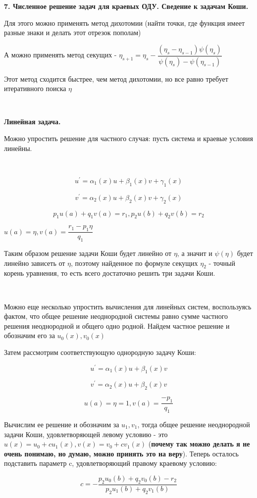 \documentclass{article}
\newenvironment{para}[1]
{\begin{Large}
\textbf{#1}
\end{Large}
\vspace{0.5cm}}
{\vspace{1cm}}
\begin{document}
\begin{para}{7. Численное решение задач для краевых ОДУ. Сведение к задачам Коши.}
Для этого можно применять метод дихотомии (найти точки, где функция имеет разные знаки и делать этот отрезок пополам)

А можно применять метод секущих - $\eta_{s + 1} = \eta_s - \dfrac{(\eta_s - \eta_{s - 1}) \psi(\eta_s)}{\psi(\eta_s) - \psi(\eta_{s - 1})}$

Этот метод сходится быстрее, чем метод дихотомии, но все равно требует итеративного поиска $\eta$

~\

\textbf{Линейная задача.}

Можно упростить решение для частного случая: пусть система и краевые условия линейны.

~\

$$u^\prime = \alpha_1 (x) u + \beta_1(x) v + \gamma_1(x)$$

$$v^\prime = \alpha_2 (x) u + \beta_2(x) v + \gamma_2(x)$$

$$ p_1u(a) + q_1v(a) = r_1, p_2u(b) + q_2v(b) = r_2 $$

$u(a) = \eta, v(a) = \dfrac{r_1 - p_1 \eta}{q_1}$


Таким образом решение задачи Коши будет линейно от $\eta$, а значит и $\psi(\eta)$ будет линейно зависеть от $\eta$, поэтому найденное по формуле секущих $\eta_2$ - точный корень уравнения, то есть всего достаточно решить три задачи Коши.

~\

Можно еще несколько упростить вычисления для линейных систем, воспользуясь фактом, что общее решение неоднородной системы равно сумме частного решения неоднородной и общего одно								родной. Найдем частное решение и обозначим его за $u_0(x), v_0(x)$

Затем рассмотрим соответствующую однородную задачу Коши:

$$u^\prime = \alpha_1 (x) u + \beta_1(x) v$$

$$v^\prime = \alpha_2 (x) u + \beta_2(x) v$$

$$u(a) = \eta = 1, v(a) = \dfrac{-p_1}{q_1}$$

Вычислим ее решение и обозначим за $u_1, v_1$, тогда общее решение неоднородной задачи Коши, удовлетворяющей левому условию - это $u(x) = u_0 + cu_1(x), v(x) = v_0 + cv_1(x)$ (\textbf{почему так можно делать я не очень понимаю, но думаю, можно принять это на веру}). Теперь осталось подставить параметр c, удовлетворяющий правому краевому условию:

$$c = -\dfrac{p_2u_0(b) + q_2v_0(b) - r_2}{p_2u_1(b) + q_2v_1(b)}$$

\end{para}
\end{document}
